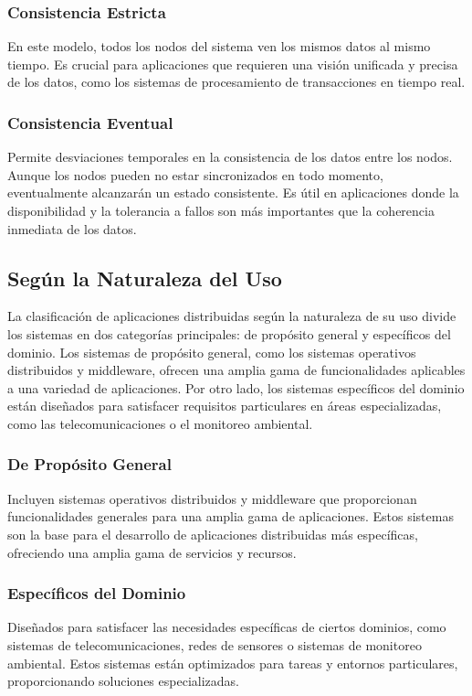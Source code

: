 \subsubsection{Consistencia Estricta}
En este modelo, todos los nodos del sistema ven los mismos datos al mismo tiempo. Es crucial para aplicaciones que requieren una visión unificada y precisa de los datos, como los sistemas de procesamiento de transacciones en tiempo real.

\subsubsection{Consistencia Eventual}
Permite desviaciones temporales en la consistencia de los datos entre los nodos. Aunque los nodos pueden no estar sincronizados en todo momento, eventualmente alcanzarán un estado consistente. Es útil en aplicaciones donde la disponibilidad y la tolerancia a fallos son más importantes que la coherencia inmediata de los datos.

\subsection{Según la Naturaleza del Uso}
La clasificación de aplicaciones distribuidas según la naturaleza de su uso divide los sistemas en dos categorías principales: de propósito general y específicos del dominio. Los sistemas de propósito general, como los sistemas operativos distribuidos y middleware, ofrecen una amplia gama de funcionalidades aplicables a una variedad de aplicaciones. Por otro lado, los sistemas específicos del dominio están diseñados para satisfacer requisitos particulares en áreas especializadas, como las telecomunicaciones o el monitoreo ambiental.

\subsubsection{De Propósito General}
Incluyen sistemas operativos distribuidos y middleware que proporcionan funcionalidades generales para una amplia gama de aplicaciones. Estos sistemas son la base para el desarrollo de aplicaciones distribuidas más específicas, ofreciendo una amplia gama de servicios y recursos.

\subsubsection{Específicos del Dominio}
Diseñados para satisfacer las necesidades específicas de ciertos dominios, como sistemas de telecomunicaciones, redes de sensores o sistemas de monitoreo ambiental. Estos sistemas están optimizados para tareas y entornos particulares, proporcionando soluciones especializadas.

